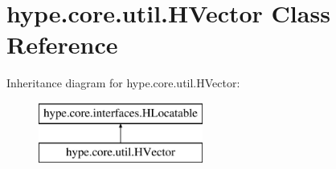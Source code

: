 \hypertarget{classhype_1_1core_1_1util_1_1_h_vector}{\section{hype.\-core.\-util.\-H\-Vector Class Reference}
\label{classhype_1_1core_1_1util_1_1_h_vector}
}
Inheritance diagram for hype.\-core.\-util.\-H\-Vector\-:\begin{figure}[H]
\begin{center}
\leavevmode
\includegraphics[height=2.000000cm]{classhype_1_1core_1_1util_1_1_h_vector}
\end{center}
\end{figure}
